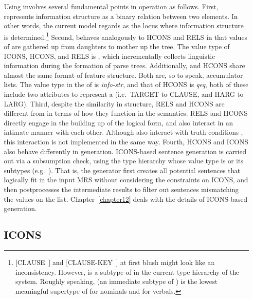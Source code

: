 Using  involves several fundamental points in operation as
follows.  First,  represents information structure as a
binary relation between two elements. In other words, the current
model regards  as the locus where information structure is
determined.\footnote{\mbox{[CLAUSE ]} and
  \mbox{[CLAUSE-KEY ]} at first blush might look like an
  inconsistency. However,  is a
  subtype of  in the current type hierarchy of the
  \lingo {} system. Roughly speaking,
   (an immediate subtype of ) is the lowest
  meaningful supertype of  for nominals and 
  for verbals.}  Second,  behaves analogously to HCONS and
RELS in that values of  are gathered up from daughters
to mother up the tree. The value type of ICONS, HCONS, and RELS is
, which incrementally collects linguistic information
during the formation of parse trees.  Additionally,  and
HCONS share almost the same format of feature structure. Both are, so
to speak, accumulator lists. The value type in the  of
 is \textit{info-str}, and that of HCONS is \textit{qeq},
both of these include two attributes to represent a  (i.e.\ TARGET to CLAUSE, and HARG to
LARG). Third, despite the similarity in
structure, RELS and HCONS are different from  in terms of
how they function in the semantics.  RELS and HCONS directly engage in
the building up of the logical form, and also interact in an intimate
manner with each other. Although  also interact with
truth-conditions \citep{partee:91}, this interaction is not
implemented in the same way.  Fourth, HCONS and ICONS also behave
differently in generation. ICONS-based sentence generation is carried
out via a subsumption check, using the type hierarchy whose value type
is  or its subtypes
(e.g.\ ). That is, the generator
first creates all potential sentences that logically fit in the input
MRS without considering the constraints on ICONS, and then
postprocesses the intermediate results to filter out sentences
mismatching the values on the 
list. Chapter~\ref{chapter12} deals with the details of ICONS-based
generation.



\subsection{ICONS}
\label{9:ssec:icons}


